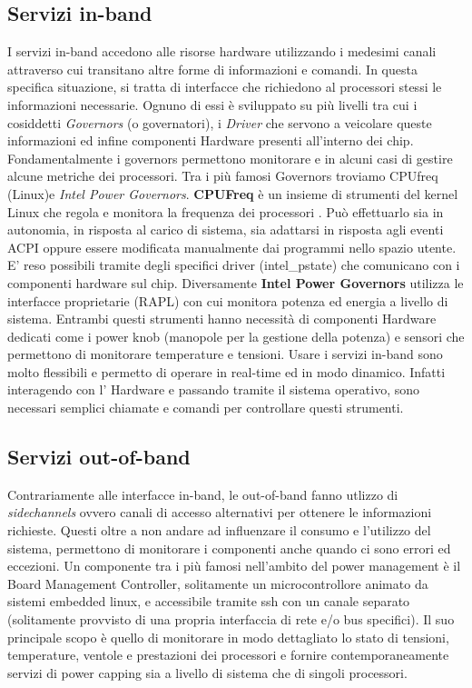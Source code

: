 \subsection{Servizi in-band} %
I servizi in-band accedono alle risorse hardware utilizzando i medesimi canali attraverso cui transitano altre forme di informazioni e comandi. In questa specifica situazione, si tratta di interfacce che richiedono al processori stessi le informazioni necessarie. Ognuno di essi è sviluppato su più livelli tra cui i cosiddetti \emph{Governors} (o governatori), i \emph{Driver} che servono a veicolare queste informazioni ed infine componenti Hardware presenti all'interno dei chip. Fondamentalmente i governors permettono monitorare e in alcuni casi di gestire alcune metriche dei processori. Tra i più famosi Governors troviamo CPUfreq\cite{TODO} (Linux)e \emph{Intel Power Governors}\cite{TODO}. \textbf{CPUFreq} è un insieme di strumenti del kernel Linux che regola e monitora la frequenza dei processori \cite{TODO}
. Può  effettuarlo sia in autonomia, in risposta al carico di sistema, sia adattarsi in risposta agli eventi ACPI oppure essere modificata manualmente dai programmi nello spazio utente. E' reso possibili tramite degli specifici driver (intel\_pstate) che comunicano con i componenti hardware sul chip. Diversamente \textbf{Intel Power Governors} utilizza le interfacce proprietarie (RAPL) con cui monitora potenza ed energia a livello di sistema.
Entrambi questi strumenti hanno necessità di componenti Hardware dedicati come i power knob (manopole per la gestione della potenza) e sensori che permettono di monitorare temperature e tensioni.
Usare i servizi in-band sono molto flessibili e permetto di operare in real-time ed in modo dinamico. Infatti interagendo con l' Hardware e passando tramite il sistema operativo, sono necessari semplici chiamate e comandi per controllare questi strumenti.




\subsection{Servizi out-of-band}
Contrariamente alle interfacce in-band, le out-of-band fanno utlizzo di \emph{sidechannels} ovvero canali di accesso alternativi per ottenere le informazioni richieste. Questi oltre a non andare ad influenzare il consumo e l'utilizzo del sistema, permettono di monitorare i componenti anche quando ci sono errori ed eccezioni. Un componente tra i più famosi nell'ambito del power management è il Board Management Controller, solitamente un microcontrollore animato da sistemi embedded linux, e accessibile tramite ssh con un canale separato (solitamente provvisto di una propria interfaccia di rete e/o bus specifici). Il suo principale scopo è quello di monitorare in modo dettagliato lo stato di tensioni, temperature, ventole e prestazioni dei processori e fornire contemporaneamente servizi di power capping sia a livello di sistema che di singoli processori. 

